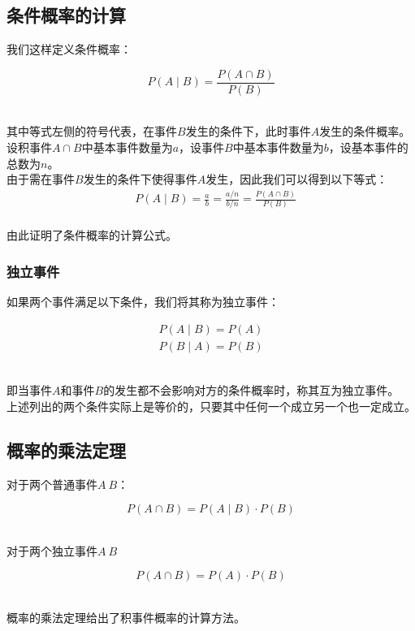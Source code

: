 \documentclass[UTF8]{ctexart}
\begin{document}
\newpage

\subsection{条件概率的计算}
    我们这样定义条件概率：
    \begin{large}
        \begin{equation*}
            P(A\mid B)=\frac{P(A\cap B)}{P(B)}
        \end{equation*}
    \end{large}\\
    其中等式左侧的符号代表，在事件$B$发生的条件下，此时事件$A$发生的条件概率。\\[6mm]
    设积事件$A\cap B$中基本事件数量为$a$，设事件$B$中基本事件数量为$b$，设基本事件的总数为$n$。\\[3mm]
    由于需在事件$B$发生的条件下使得事件$A$发生，因此我们可以得到以下等式：\vspace{10pt}
    \setcounter{equation}{0}
    \begin{align}
        &P(A\mid B)
        =\frac{a}{b}
        =\frac{a/n}{b/n}
        =\frac{P(A\cap B)}{P(B)}
    \end{align}\\
    由此证明了条件概率的计算公式。

\subsubsection{独立事件}
    如果两个事件满足以下条件，我们将其称为独立事件：
    \begin{large}
        \begin{align*}
            P(A\mid B)=P(A)\\[3mm]
            P(B\mid A)=P(B)
        \end{align*}
    \end{large}\\
    即当事件$A$和事件$B$的发生都不会影响对方的条件概率时，称其互为独立事件。\\[3mm]
    上述列出的两个条件实际上是等价的，只要其中任何一个成立另一个也一定成立。\\

\subsection{概率的乘法定理}
    对于两个普通事件$A~B$：
    \begin{large}
        \begin{equation*}
            P(A\cap B)=P(A\mid B)\cdot P(B)
        \end{equation*}
    \end{large}\\
    对于两个独立事件$A~B$
    \begin{large}
        \begin{equation*}
            P(A\cap B)=P(A)\cdot P(B)
        \end{equation*}
    \end{large}\\
    概率的乘法定理给出了积事件概率的计算方法。
\end{document}
